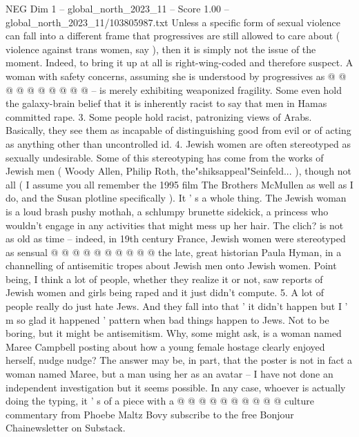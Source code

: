 \begin{textsample}{NEG Dim 1 – global\_north\_2023\_11 – Score 1.00 – global\_north\_2023\_11/103805987.txt}
Unless a specific form of sexual violence can fall into a different frame that progressives are still allowed to care about ( violence against trans women, say ), then it is simply not the issue of the moment.
Indeed, to bring it up at all is right-wing-coded and therefore suspect.
A woman with safety concerns, assuming she is understood by progressives as @ @ @ @ @ @ @ @ @ @ -- is merely exhibiting weaponized fragility.
Some even hold the galaxy-brain belief that it is inherently racist to say that men in Hamas committed rape. 3.
Some people hold racist, patronizing views of Arabs.
Basically, they see them as incapable of distinguishing good from evil or of acting as anything other than uncontrolled id. 4.
Jewish women are often stereotyped as sexually undesirable.
Some of this stereotyping has come from the works of Jewish men ( Woody Allen, Philip Roth, the"shiksappeal"Seinfeld... ), though not all ( I assume you all remember the 1995 film The Brothers McMullen as well as I do, and the Susan plotline specifically ).
It ' s a whole thing.
The Jewish woman is a loud brash pushy mothah, a schlumpy brunette sidekick, a princess who wouldn't engage in any activities that might mess up her hair.
The clich? is not as old as time -- indeed, in 19th century France, Jewish women were stereotyped as sensual @ @ @ @ @ @ @ @ @ @ the late, great historian Paula Hyman, in a channelling of antisemitic tropes about Jewish men onto Jewish women.
Point being, I think a lot of people, whether they realize it or not, saw reports of Jewish women and girls being raped and it just didn't compute. 5.
A lot of people really do just hate Jews.
And they fall into that ' it didn't happen but I ' m so glad it happened ' pattern when bad things happen to Jews.
Not to be boring, but it might be antisemitism.
Why, some might ask, is a woman named Maree Campbell posting about how a young female hostage clearly enjoyed herself, nudge nudge?
The answer may be, in part, that the poster is not in fact a woman named Maree, but a man using her as an avatar -- I have not done an independent investigation but it seems possible.
In any case, whoever is actually doing the typing, it ' s of a piece with a @ @ @ @ @ @ @ @ @ @ culture commentary from Phoebe Maltz Bovy subscribe to the free Bonjour Chainewsletter on Substack.

\end{textsample}
